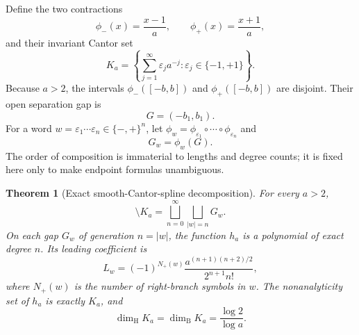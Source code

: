 \documentclass[11pt,oneside]{article}
\newtheorem{theorem}{Theorem}[section]
\theoremstyle{definition}
\theoremstyle{remark}
\begin{document}
Define the two contractions
\begin{equation}
  \phi_-(x)=\frac{x-1}{a},
  \qquad
  \phi_+(x)=\frac{x+1}{a},
  \label{eq:ifs-maps}
\end{equation}
and their invariant Cantor set
\begin{equation}
  K_a=\left\{\sum_{j=1}^{\infty}\varepsilon_j a^{-j}:
     \varepsilon_j\in\{-1,+1\}\right\}.
  \label{eq:Ka}
\end{equation}
Because \(a>2\), the intervals \(\phi_-([-b,b])\) and \(\phi_+([-b,b])\) are disjoint.  Their open separation gap is
\begin{equation}
  G=(-b_1,b_1).
  \label{eq:central-gap-G}
\end{equation}
For a word \(w=\varepsilon_1\cdots\varepsilon_n\in\{-,+\}^n\), let
\(\phi_w=\phi_{\varepsilon_1}\circ\cdots\circ\phi_{\varepsilon_n}\) and
\begin{equation}
  G_w=\phi_w(G).
  \label{eq:gap-word}
\end{equation}
The order of composition is immaterial to lengths and degree counts; it is fixed here only to make endpoint formulas unambiguous.

\begin{theorem}[Exact smooth-Cantor-spline decomposition]
\label{thm:exact-cantor-spline}
For every \(a>2\),
\begin{equation}
  [-b,b]\setminus K_a=\bigsqcup_{n=0}^{\infty}
     \bigsqcup_{|w|=n}G_w.
  \label{eq:gap-decomposition}
\end{equation}
On each gap \(G_w\) of generation \(n=|w|\), the function \(h_a\) is a polynomial of exact degree \(n\).  Its leading coefficient is
\begin{equation}
  L_w=(-1)^{N_+(w)}
  \frac{a^{(n+1)(n+2)/2}}{2^{n+1}n!},
  \label{eq:gap-leading-coefficient}
\end{equation}
where \(N_+(w)\) is the number of right-branch symbols in \(w\).  The nonanalyticity set of \(h_a\) is exactly \(K_a\), and
\begin{equation}
  \dim_{\mathrm H}K_a=\dim_{\mathrm B}K_a=\frac{\log2}{\log a}.
  \label{eq:Ka-dimension}
\end{equation}
\end{theorem}
\end{document}
